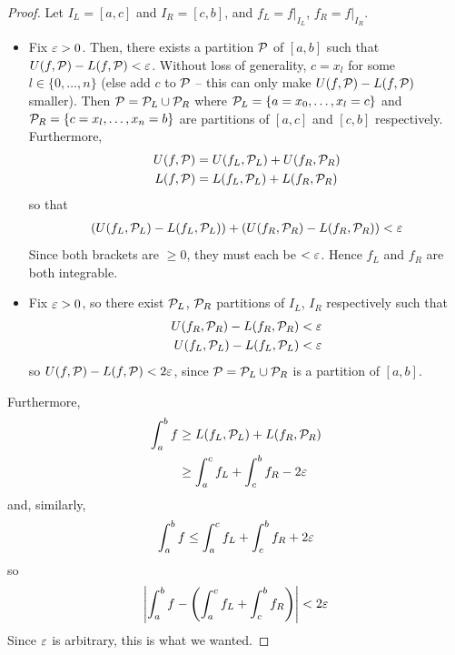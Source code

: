 \documentclass{../../template/note}
\begin{document}
    \begin{proof}
        Let \(I_L = [a, c]\) and \(I_R = [c, b]\), and \(f_L = \left.f\right|_{I_L}\), \(f_R = \left.f\right|_{I_R}\).
        \begin{itemize}
            \item[\(\implies\)] Fix \(\varepsilon > 0\). Then, there exists a partition \(\mathcal{P}\) of \([a, b]\) such that \(U(f, \mathcal{P}) - L(f, \mathcal{P}) < \varepsilon\). Without loss of generality, \(c = x_l\) for some \(l \in \{0, \dots, n\}\) (else add \(c\) to \(\mathcal{P}\) -- this can only make \(U(f, \mathcal{P}) - L(f, \mathcal{P})\) smaller). Then \(\mathcal{P} = \mathcal{P}_L \cup \mathcal{P}_R\) where \(\mathcal{P}_L = \{a = x_0, \dots, x_l = c\}\) and \(\mathcal{P}_R = \{c = x_l, \dots, x_n = b\}\) are partitions of \([a, c]\) and \([c, b]\) respectively. Furthermore,
            \begin{align*}
                U(f, \mathcal{P}) &= U(f_L, \mathcal{P}_L) + U(f_R, \mathcal{P}_R) \\
                L(f, \mathcal{P}) &= L(f_L, \mathcal{P}_L) + L(f_R, \mathcal{P}_R)
            \end{align*}
            so that
            \begin{align*}
                \left(U(f_L, \mathcal{P}_L)-L(f_L, \mathcal{P}_L)\right) + \left(U(f_R, \mathcal{P}_R)-L(f_R, \mathcal{P}_R)\right) < \varepsilon
            \end{align*}
            Since both brackets are \(\geq 0\), they must each be \(< \varepsilon\). Hence \(f_L\) and \(f_R\) are both integrable.

            \item[\(\impliedby\)] Fix \(\varepsilon > 0\), so there exist \(\mathcal{P}_L\), \(\mathcal{P}_R\) partitions of \(I_L\), \(I_R\) respectively such that
            \begin{align*}
                U(f_R, \mathcal{P}_R) - L(f_R, \mathcal{P}_R) &< \varepsilon \\
                U(f_L, \mathcal{P}_L) - L(f_L, \mathcal{P}_L) &< \varepsilon
            \end{align*}
            so \(U(f, \mathcal{P}) - L(f, \mathcal{P}) < 2\varepsilon\), since \(\mathcal{P} = \mathcal{P}_L \cup \mathcal{P}_R\) is a partition of \([a, b]\). 
        \end{itemize}
        Furthermore,
        \begin{align*}
            \int_a^b f &\geq L(f_L, \mathcal{P}_L) + L(f_R, \mathcal{P}_R) \\
            &\geq \int_a^c f_L + \int_c^b f_R - 2\varepsilon
        \end{align*}
        and, similarly,
        \begin{align*}
            \int_a^b f \leq \int_a^c f_L + \int_c^b f_R + 2\varepsilon
        \end{align*}
        so
        \begin{align*}
            \left|\int_a^b f - \left(\int_a^c f_L + \int_c^b f_R\right)\right| < 2\varepsilon
        \end{align*}
        Since \(\varepsilon\) is arbitrary, this is what we wanted.        
    \end{proof}
\end{document}
